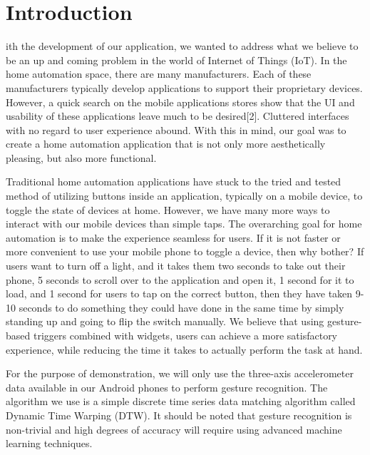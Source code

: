 \documentclass[journal]{IEEEtran}
\begin{document}
\section{Introduction}
% 
% 
% 
% 
ith the development of our application, we wanted to address what we believe to be an up and coming problem in the world of Internet of Things (IoT). In the home automation space, there are many manufacturers. Each of these manufacturers typically develop applications to support their proprietary devices. However, a quick search on the mobile applications stores show that the UI and usability of these applications leave much to be desired[2]. Cluttered interfaces with no regard to user experience abound. With this in mind, our goal was to create a home automation application that is not only more aesthetically pleasing, but also more functional.

Traditional home automation applications have stuck to the tried and tested method of utilizing buttons inside an application, typically on a mobile device, to toggle the state of devices at home. However, we have many more ways to interact with our mobile devices than simple taps. The overarching goal for home automation is to make the experience seamless for users. If it is not faster or more convenient to use your mobile phone to toggle a device, then why bother? If users want to turn off a light, and it takes them two seconds to take out their phone, 5 seconds to scroll over to the application and open it, 1 second for it to load, and 1 second for users to tap on the correct button, then they have taken 9-10 seconds to do something they could have done in the same time by simply standing up and going to flip the switch manually. We believe that using gesture-based triggers combined with widgets, users can achieve a more satisfactory experience, while reducing the time it takes to actually perform the task at hand. 

For the purpose of demonstration, we will only use the three-axis accelerometer data available in our Android phones to perform gesture recognition. The algorithm we use is a simple discrete time series data matching algorithm called Dynamic Time Warping (DTW). It should be noted that gesture recognition is non-trivial and high degrees of accuracy will require using advanced machine learning techniques. 
\end{document}
